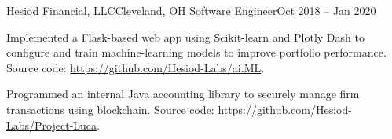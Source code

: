 \begin{ritemize}
	{Hesiod Financial, LLC}{Cleveland, OH}
	{Software Engineer}{Oct 2018 -- Jan 2020}
	\item Implemented a Flask-based web app using Scikit-learn and Plotly Dash to configure and train machine-learning models to improve portfolio performance. Source code: \url{https://github.com/Hesiod-Labs/ai.ML}.
	\item Programmed an internal Java accounting library to securely manage firm transactions using blockchain. Source code: \url{https://github.com/Hesiod-Labs/Project-Luca}.
\end{ritemize}